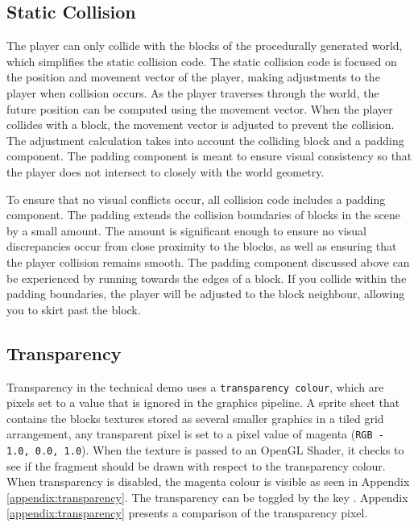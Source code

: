 \documentclass[a4paper,11pt,titlepage]{scrartcl}
\begin{document}
\subsection{Static Collision}
\label{section:collision}
The player can only collide with the blocks of the procedurally generated world, which simplifies the static collision code.  The static collision code is focused on the position and movement vector of the player, making adjustments to the player when collision occurs.  As the player traverses through the world, the future position can be computed using the movement vector.  When the player collides with a block, the movement vector is adjusted to prevent the collision.  The adjustment calculation takes into account the colliding block and a padding component.  The padding component is meant to ensure visual consistency so that the player does not intersect to closely with the world geometry.

To ensure that no visual conflicts occur, all collision code includes a padding component.  The padding extends the collision boundaries of blocks in the scene by a small amount.   The amount is significant enough to ensure no visual discrepancies occur from close proximity to the blocks, as well as ensuring that the player collision remains smooth.  The padding component discussed above can be experienced by running towards the edges of a block.  If you collide within the padding boundaries, the player will be adjusted to the block neighbour, allowing you to skirt past the block.
   
\subsection{Transparency}
\label{section:transparency}
Transparency in the technical demo uses a \texttt{transparency colour}, which are pixels set to a value that is ignored in the graphics pipeline.  A sprite sheet that contains the blocks textures stored as several smaller graphics in a tiled grid arrangement, any transparent pixel is set to a pixel value of magenta (\texttt{RGB - 1.0, 0.0, 1.0}).  When the texture is passed to an OpenGL Shader, it checks to see if the fragment should be drawn with respect to the transparency colour.  When transparency is disabled, the magenta colour is visible as seen in Appendix \ref{appendix:transparency}.
\vskip 2.5mm\noindent
The transparency can be toggled by the key .  Appendix \ref{appendix:transparency} presents a comparison of the transparency pixel.
    
\end{document}
